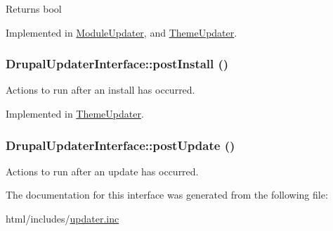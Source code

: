 \begin{DoxyReturn}{Returns}
bool 
\end{DoxyReturn}


Implemented in \hyperlink{classModuleUpdater_af9033e41acac0be1e70097ca3303b1ed}{ModuleUpdater}, and \hyperlink{classThemeUpdater_aa150c0bf1bc488f7cc32f681eb7ff4b6}{ThemeUpdater}.\hypertarget{interfaceDrupalUpdaterInterface_a392c2cdc12736286a18ec819732f9156}{
\subsubsection[{postInstall}]{\setlength{\rightskip}{0pt plus 5cm}DrupalUpdaterInterface::postInstall ()}}
\label{interfaceDrupalUpdaterInterface_a392c2cdc12736286a18ec819732f9156}
Actions to run after an install has occurred. 

Implemented in \hyperlink{classThemeUpdater_a66e74f3e7f7116e77355947e11d038e1}{ThemeUpdater}.\hypertarget{interfaceDrupalUpdaterInterface_a1790c6a7add39fa1265ab37bcd2a7f94}{
\subsubsection[{postUpdate}]{\setlength{\rightskip}{0pt plus 5cm}DrupalUpdaterInterface::postUpdate ()}}
\label{interfaceDrupalUpdaterInterface_a1790c6a7add39fa1265ab37bcd2a7f94}
Actions to run after an update has occurred. 

The documentation for this interface was generated from the following file:\begin{DoxyCompactItemize}
\item 
html/includes/\hyperlink{updater_8inc}{updater.inc}\end{DoxyCompactItemize}
